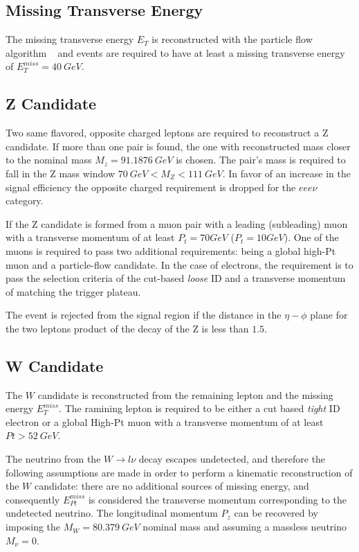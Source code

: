 \subsection{Missing Transverse Energy}

The missing transverse energy $E_T$ is reconstructed with the particle flow
algorithm ~\cite{particleflow} and events are required to have at least a
missing transverse energy of $E_T^{miss}=40~GeV$.

\subsection{Z Candidate}

Two same flavored, opposite charged leptons are required to reconstruct a Z
candidate. If more than one pair is found, the one with reconstructed mass
closer to the nominal mass $M_z=91.1876~GeV$ is chosen. The pair's mass
is required to fall in the Z mass window $70~GeV < M_Z < 111~GeV$. In favor of an
increase in the signal efficiency the opposite charged requirement is dropped
for the $eee\nu$ category.

If the Z candidate is formed from a muon pair with a leading (subleading) muon with
a transverse momentum of at least $P_t=70 GeV$ ($P_t=10GeV$). One of the
muons is required to pass two additional requirements: being a global high-Pt muon and a
particle-flow candidate. In the case of electrons, the requirement is to pass the
selection criteria of the cut-based \emph{loose} ID and a transverse momentum of
matching the trigger plateau.

The event is rejected from the signal region if the distance in the $\eta-\phi$
plane for the two leptons product of the decay of the Z is less than $1.5$.

\subsection{W Candidate}

The $W$ candidate is reconstructed from the remaining lepton and the missing energy
$E_T^{miss}$. The ramining lepton is required to be either a cut based \emph{tight}
ID electron or a global High-Pt muon with a transverse momentum
of at least $Pt>52~GeV$.

The neutrino from the $W \rightarrow l\nu$ decay escapes undetected,
and therefore the following assumptions are made in order to perform a kinematic
reconstruction of the $W$ candidate: there are no additional sources of missing
energy, and consequently $E_{Pt}^{miss}$ is considered the transverse momentum
corresponding to the undetected neutrino. The longitudinal momentum $P_z$ can be
recovered by imposing the $M_W=80.379~GeV $ nominal mass and assuming
a massless neutrino $M_\nu = 0.$

